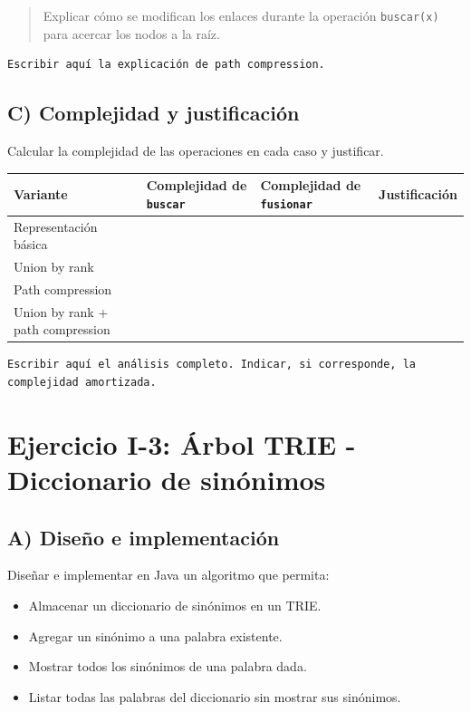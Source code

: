 \documentclass[11pt]{article}
\begin{document}
\begin{quote}
Explicar cómo se modifican los enlaces durante la operación \texttt{buscar(x)} para acercar los nodos a la raíz.
\end{quote}

\begin{verbatim}
Escribir aquí la explicación de path compression.
\end{verbatim}

\subsection{C) Complejidad y justificación}
\label{sec:orgaa3bc6d}

Calcular la complejidad de las operaciones en cada caso y justificar.

\begin{center}
\begin{tabular}{llll}
Variante & Complejidad de \texttt{buscar} & Complejidad de \texttt{fusionar} & Justificación\\[0pt]
\hline
Representación básica &  &  & \\[0pt]
Union by rank &  &  & \\[0pt]
Path compression &  &  & \\[0pt]
Union by rank + path compression &  &  & \\[0pt]
\end{tabular}
\end{center}

\begin{verbatim}
Escribir aquí el análisis completo. Indicar, si corresponde, la complejidad amortizada.
\end{verbatim}

\section{Ejercicio I-3: Árbol TRIE - Diccionario de sinónimos}
\label{sec:org5b111f7}

\subsection{A) Diseño e implementación}
\label{sec:org9ebff28}

Diseñar e implementar en Java un algoritmo que permita:

\begin{itemize}
\item[{$\square$}] Almacenar un diccionario de sinónimos en un TRIE.
\item[{$\square$}] Agregar un sinónimo a una palabra existente.
\item[{$\square$}] Mostrar todos los sinónimos de una palabra dada.
\item[{$\square$}] Listar todas las palabras del diccionario sin mostrar sus sinónimos.
\end{itemize}
\end{document}
